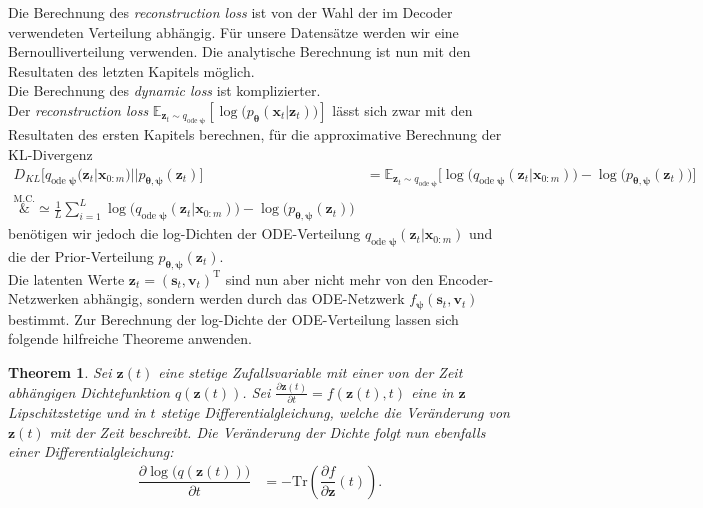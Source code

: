 \documentclass[12pt]{article}
\newcommand{\E}{\mathbb{E}}
\newtheorem{theorem}{Theorem}
\begin{document}
	Die Berechnung des \emph{reconstruction loss} ist von der Wahl der im Decoder verwendeten Verteilung abhängig. Für unsere Datensätze werden wir eine Bernoulliverteilung verwenden.
	Die analytische Berechnung ist nun mit den Resultaten des letzten Kapitels möglich.\\
	Die Berechnung des \emph{dynamic loss} ist komplizierter. \\
	Der \emph{reconstruction loss} $\E_{\mathbf{z}_{t}\sim q_{\text{ode }\boldsymbol\psi}}
	\left[\log\big(p_{\boldsymbol\theta}\left(\mathbf{x}_{t}|\mathbf{z}_{t}\right)\big)\right] $ lässt sich zwar mit den Resultaten des ersten Kapitels berechnen, für die approximative Berechnung der KL-Divergenz
	\begin{align*}
	D_{KL}\big[q_{\text{ode }\boldsymbol\psi}(\mathbf{z}_{t}|\mathbf{x}_{0:m})||p_{\boldsymbol\theta,\boldsymbol\psi}(\mathbf{z}_{t})\big]
	&=\mathbb{E}_{\mathbf{z}_{t}\sim q_{\text{ode }\boldsymbol\psi}}\big[\log\big(q_{\text{ode }\boldsymbol\psi}(\mathbf{z}_{t}|\mathbf{x}_{0:m}) \big) - \log\big(p_{\boldsymbol\theta,\boldsymbol\psi}(\mathbf{z}_{t}) \big)\big] \\
	\overset{\text{M.C.}}&{\simeq} \frac{1}{L} \sum_{i=1}^{L} \log\big(q_{\text{ode }\boldsymbol\psi}(\mathbf{z}_{t}|\mathbf{x}_{0:m}) \big) - \log\big(p_{\boldsymbol\theta,\boldsymbol\psi}(\mathbf{z}_{t}) \big)
	\end{align*}
	benötigen wir jedoch die log-Dichten der ODE-Verteilung $q_{\text{ode }\boldsymbol\psi}(\mathbf{z}_{t}|\mathbf{x}_{0:m})$ und die der Prior-Verteilung $p_{\boldsymbol\theta,\boldsymbol\psi}(\mathbf{z}_{t})$.\\
	Die latenten Werte $\mathbf{z}_{t} = (\mathbf{s}_{t},\mathbf{v}_{t})^{\mathrm{T}}$ sind nun aber nicht mehr von den Encoder-Netzwerken abhängig, sondern werden durch das ODE-Netzwerk $f_{\boldsymbol\psi}(\mathbf{s}_{t},\mathbf{v}_{t})$ bestimmt.
	Zur Berechnung der log-Dichte der ODE-Verteilung lassen sich folgende hilfreiche Theoreme anwenden.
	\begin{theorem}
		Sei $\mathbf{z}(t)$ eine stetige Zufallsvariable mit einer von der Zeit abhängigen Dichtefunktion $q(\mathbf{z}(t))$. Sei $\tfrac{\partial \mathbf{z}(t)}{\partial t}=f(\mathbf{z}(t),t)$ eine in $\mathbf{z}$ Lipschitzstetige und in $t$ stetige Differentialgleichung, welche die Veränderung von $\mathbf{z}(t)$ mit der Zeit beschreibt.
		Die Veränderung der Dichte folgt nun ebenfalls einer Differentialgleichung:
		\begin{align*}
		\dfrac{\partial \log\big(q(\mathbf{z}(t))\big)}{\partial t}&= - \mathrm{Tr}\left(\dfrac{\partial f}{\partial\mathbf{z}}(t)\right).
		\end{align*}
	\end{theorem}
\end{document}
